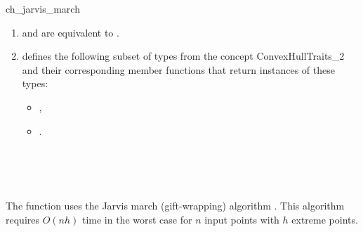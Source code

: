 \begin{ccRefFunction}{ch_jarvis_march}
\begin{enumerate}
   \item    {} and 
            are equivalent to .
   \item    {} defines the following subset of types from
            the concept ConvexHullTraits\_2 and their corresponding member
            functions that return instances of these types:
            \begin{itemize}
                \item {},
                \item {}.
            \end{itemize}
\end{enumerate}

\ccSeeAlso

 \\
 \\
 \\


\ccImplementation

The function uses the Jarvis march (gift-wrapping)
algorithm \cite{j-ichfs-73}. This algorithm requires $O(n h)$ time 
in the worst case for $n$ input points with $h$ extreme points.  
\end{ccRefFunction}


